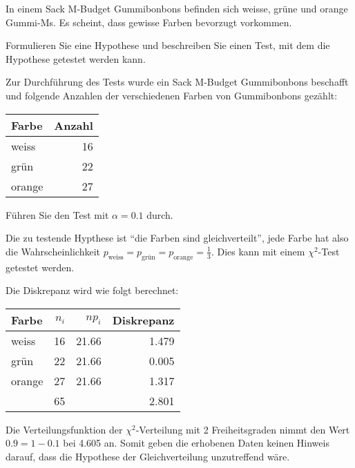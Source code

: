 In einem Sack M-Budget Gummibonbons befinden sich weisse, grüne und orange
Gummi-Ms. Es scheint, dass gewisse Farben bevorzugt vorkommen.
\begin{teilaufgaben}
\item Formulieren Sie eine Hypothese und beschreiben Sie einen Test, mit
dem die Hypothese getestet werden kann.
\item Zur Durchführung des Tests wurde ein Sack M-Budget Gummibonbons
beschafft und folgende Anzahlen der verschiedenen Farben von Gummibonbons
gezählt:
\begin{center}
\begin{tabular}{lr}
Farbe&Anzahl\\
\hline
weiss&16\\
grün&22\\
orange&27
\end{tabular}
\end{center}
Führen Sie den Test mit $\alpha = 0.1$ durch.
\end{teilaufgaben}


\begin{loesung}
\begin{teilaufgaben}
\item Die zu testende Hypthese ist ``die Farben sind gleichverteilt'', jede Farbe
hat also die Wahrscheinlichkeit
$p_{\text{weiss}}=p_{\text{grün}}=p_{\text{orange}}=\frac13$. Dies kann
mit einem $\chi^2$-Test getestet werden.
\item Die Diskrepanz wird wie folgt berechnet:
\begin{center}
\begin{tabular}{lrrr}
Farbe&$n_i$&$np_i$&Diskrepanz\\
\hline
weiss&16&21.66&1.479\\
grün&22&21.66&0.005\\
orange&27&21.66&1.317\\
\hline
&65&&2.801
\end{tabular}
\end{center}
Die Verteilungsfunktion der $\chi^2$-Verteilung mit 2 Freiheitsgraden nimmt
den Wert $0.9=1-0.1$ bei 4.605 an. Somit geben die erhobenen Daten keinen
Hinweis darauf, dass die Hypothese der Gleichverteilung unzutreffend wäre.
\qedhere
\end{teilaufgaben}
\end{loesung}

